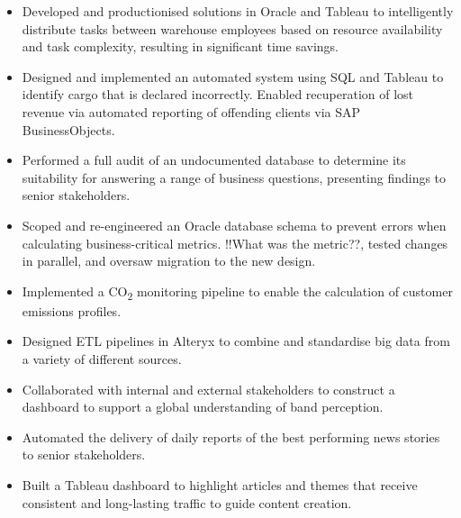 \documentclass[10pt,a4paper,ragged2e,withhyper]{altacv}
\begin{document}
\begin{paracol}{2}
\begin{itemize}
\end{itemize}

\divider

\begin{itemize}
\item Developed and productionised solutions in Oracle and Tableau to intelligently distribute tasks between warehouse employees based on resource availability and task complexity, resulting in significant time savings.
\item Designed and implemented an automated system using SQL and Tableau to identify cargo that is declared incorrectly. Enabled recuperation of lost revenue via automated reporting of offending clients via SAP BusinessObjects.
\item Performed a full audit of an undocumented database to determine its suitability for answering a range of business questions, presenting findings to senior stakeholders.
\item Scoped and re-engineered an Oracle database schema to prevent errors when calculating business-critical metrics. !!What was the metric??, tested changes in parallel, and oversaw migration to the new design.
\item Implemented a CO\textsubscript{2} monitoring pipeline to enable the calculation of customer emissions profiles.
\end{itemize}

\divider

\begin{itemize}
\item Designed ETL pipelines in Alteryx to combine and standardise big data from a variety of different sources.
\item Collaborated with internal and external stakeholders to construct a dashboard to support a global understanding of band perception.
\item Automated the delivery of daily reports of the best performing news stories to senior stakeholders.
\item Built a Tableau dashboard to highlight articles and themes that receive consistent and long-lasting traffic to guide content creation.

\end{itemize}

\switchcolumn


\end{paracol}
\end{document}
